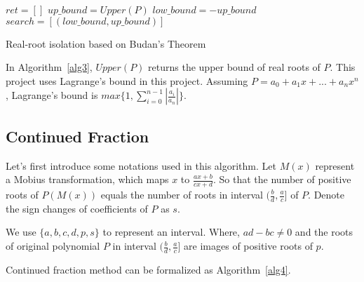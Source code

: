 \begin{algorithm}[H]
\label{alg3}
\SetAlgoLined


  $ret = []$\;
  $up\_bound = Upper(P)$\;
  $low\_bound = - up\_bound$\;
  $search = [(low\_bound, up\_bound)]$\;


  \;
\caption{Real-root isolation based on Budan's Theorem}
\end{algorithm}

In Algorithm~\ref{alg3}, $Upper(P)$ returns the upper bound of real roots of
$P$. This project uses Lagrange's bound\cite{Lag} in this project. Assuming $P =
a_0 + a_1x + ... + a_nx^n$, Lagrange's bound is $max\{1,
\sum_{i=0}^{n-1}|\frac{a_i}{a_n}|\}$.





\subsection{Continued Fraction}

Let's first introduce some notations used in this algorithm. Let $M(x)$
represent a Mobius transformation, which maps $x$ to $\frac{ax+b}{cx+d}$. So
that the number of positive roots of $P(M(x))$ equals the number of roots in
interval $(\frac{b}{d}, \frac{a}{c}]$ of $P$. Denote the sign changes of 
coefficients of $P$ as $s$.

We use $\{a,b,c,d,p, s\}$ to represent an interval. Where, $ad-bc \neq 0$ and the
roots of original polynomial $P$ in interval $(\frac{b}{d},\frac{a}{c}]$ are
images of positive roots of $p$.

Continued fraction method can be formalized as Algorithm~\ref{alg4}. 


